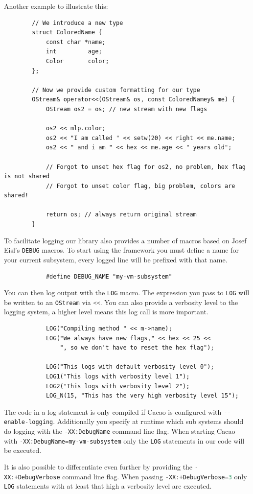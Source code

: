 \documentclass[12pt,a4paper,oneside]{article}
\newcommand{\cpp}[1]{\lstinline[language=C++]{#1}}
\begin{document}
	Another example to illustrate this:
		\begin{lstlisting}
		// We introduce a new type
		struct ColoredName {
			const char *name;
			int         age;
 			Color       color;
		};

		// Now we provide custom formatting for our type
		OStream& operator<<(OStream& os, const ColoredNamey& me) {
			OStream os2 = os; // new stream with new flags

			os2 << mlp.color;
			os2 << "I am called " << setw(20) << right << me.name;
			os2 << " and i am " << hex << me.age << " years old";

			// Forgot to unset hex flag for os2, no problem, hex flag is not shared
			// Forgot to unset color flag, big problem, colors are shared!

			return os; // always return original stream
		}
		\end{lstlisting}

	To facilitate logging our library also provides a number of macros based on Josef Eisl's \cpp{DEBUG} macros.
	To start using the framework you must define a name for your current subsystem,
	every logged line will be prefixed with that name.
		\begin{lstlisting}
			#define DEBUG_NAME "my-vm-subsystem"
		\end{lstlisting}
	You can then log output with the \cpp{LOG} macro.
	The expression you pass to \cpp{LOG} will be written to an \cpp{OStream} via \cpp{<<}.
	You can also provide a verbosity level to the logging system, a higher level means this log call is more important.
		\begin{lstlisting}
			LOG("Compiling method " << m->name);
			LOG("We always have new flags," << hex << 25 << 
				", so we don't have to reset the hex flag");

			LOG("This logs with default verbosity level 0");
			LOG1("This logs with verbosity level 1");
			LOG2("This logs with verbosity level 2");
			LOG_N(15, "This has the very high verbosity level 15");
		\end{lstlisting}

	The code in a log statement is only compiled if Cacao is configured with \cpp{--enable-logging}.
	Additionally you specify at runtime which sub systems should do logging with the \cpp{-XX:DebugName} command line flag.
	When starting Cacao with \cpp{-XX:DebugName=my-vm-subsystem} only the \cpp{LOG} statements in our code will be executed.

	It is also possible to differentiate even further by providing the \cpp{-XX:+DebugVerbose} command line flag.
	When passing \cpp{-XX:+DebugVerbose=3} only \cpp{LOG} statements with at least that high a verbosity level are executed.
\end{document}
